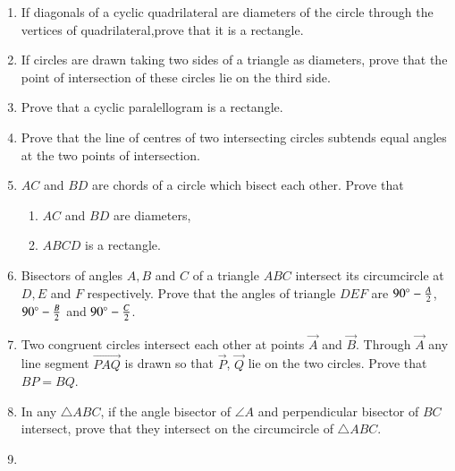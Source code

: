 \begin{enumerate}[label=\thesection.\arabic*,ref=\thesection.\theenumi]
\item If diagonals of a cyclic quadrilateral are diameters of the circle through the vertices of quadrilateral,prove that it is a rectangle.\\
\label{chapters/9/10/5/7}
\solution

\item If circles are drawn taking two sides of a triangle as diameters, prove that the point of intersection of these circles lie on the third side.
\label{chapters/9/10/5/10}
\\
\solution

    \item Prove that a cyclic paralellogram is a rectangle.
\label{chapters/9/10/5/12}
\\
\solution

\item Prove that the line of centres of two intersecting circles subtends equal angles at the two points of intersection.
\\
    \solution 
\label{chapters/9/10/6/1}

\item  $AC$ and $BD$ are chords of a circle which bisect each other. Prove that 
	\begin{enumerate}
		\item  $AC$ and $BD$ are diameters, 
		\item  $ABCD$ is a rectangle.
	\end{enumerate}
    \solution 
\label{chapters/9/10/6/7}

\item Bisectors of angles $A,B$ and $C$ of a triangle $ABC$ intersect its circumcircle at $D,E$ and $F$ respectively. Prove that the angles of triangle $DEF$ are $90{\degree} - \frac{A}{2}$, $90{\degree}-\frac{B}{2}$ and $90{\degree} - \frac{C}{2}$.
\label{chapters/9/10/6/8}
\\
    \solution 

\item Two congruent circles intersect each other at points $\vec{A}$ and $\vec{B}$. Through $\vec{A}$ any line segment $\vec{PAQ}$ is drawn so that $\vec{P}$, $\vec{Q}$ lie on the two circles. Prove that $BP = BQ$.
\label{chapters/9/10/6/9}
\\
    \solution 

\item In any $\triangle ABC$, if the angle bisector of $\angle A$ and 
    perpendicular bisector of $BC$ intersect, prove that they intersect on 
    the circumcircle of $\triangle ABC$.
\\
    \solution 
\label{chapters/9/10/6/10}


\item

\end{enumerate}
